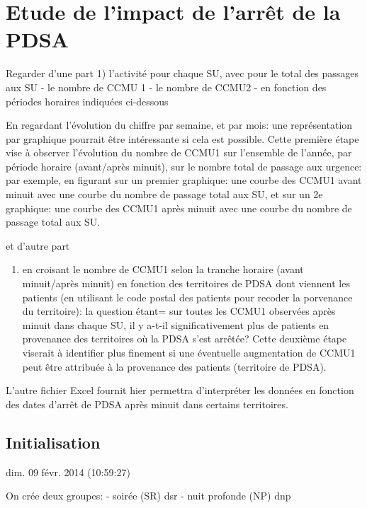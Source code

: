 \section{Etude de l'impact de l'arrêt de la PDSA}

Regarder d'une part 1) l'activité pour chaque SU, avec pour le total des
passages aux SU - le nombre de CCMU 1 - le nombre de CCMU2 - en fonction
des périodes horaires indiquées ci-dessous

En regardant l'évolution du chiffre par semaine, et par mois: une
représentation par graphique pourrait être intéressante si cela est
possible. Cette première étape vise à observer l'évolution du nombre de
CCMU1 sur l'ensemble de l'année, par période horaire (avant/après
minuit), sur le nombre total de passage aux urgence: par exemple, en
figurant sur un premier graphique: une courbe des CCMU1 avant minuit
avec une courbe du nombre de passage total aux SU, et sur un 2e
graphique: une courbe des CCMU1 après minuit avec une courbe du nombre
de passage total aux SU.

et d'autre part

\begin{enumerate}
\def\labelenumi{\arabic{enumi})}
\setcounter{enumi}{1}
\itemsep1pt\parskip0pt
\item
  en croisant le nombre de CCMU1 selon la tranche horaire (avant
  minuit/après minuit) en fonction des territoires de PDSA dont viennent
  les patients (en utilisant le code postal des patients pour recoder la
  porvenance du territoire): la question étant= sur toutes les CCMU1
  observées après minuit dans chaque SU, il y a-t-il significativement
  plus de patients en provenance des territoires où la PDSA s'est
  arrêtée? Cette deuxième étape viserait à identifier plus finement si
  une éventuelle augmentation de CCMU1 peut être attribuée à la
  provenance des patients (territoire de PDSA).
\end{enumerate}

L'autre fichier Excel fournit hier permettra d'interpréter les données
en fonction des dates d'arrêt de PDSA après minuit dans certains
territoires.

\subsection{Initialisation}

dim. 09 févr. 2014 (10:59:27)

On crée deux groupes: - soirée (SR) dsr - nuit profonde (NP) dnp

